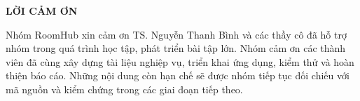 \documentclass[../DoAn.tex]{subfiles}
\begin{document}
\begin{center}\bfseries\large LỜI CẢM ƠN\end{center}
\vspace{0.5cm}
Nhóm RoomHub xin cảm ơn TS. Nguyễn Thanh Bình và các thầy cô đã hỗ trợ nhóm trong quá trình học tập, phát triển bài tập lớn. Nhóm cảm ơn các thành viên đã cùng xây dựng tài liệu nghiệp vụ, triển khai ứng dụng, kiểm thử và hoàn thiện báo cáo. Những nội dung còn hạn chế sẽ được nhóm tiếp tục đối chiếu với mã nguồn và kiểm chứng trong các giai đoạn tiếp theo.
\end{document}
